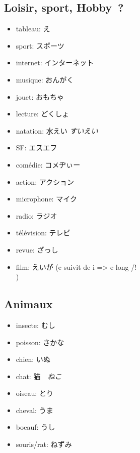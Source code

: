 \documentclass{article}
\begin{document}
\begin{CJK}{UTF8}{min}
   \subsection{Loisir, sport, Hobby~?}
        \begin{itemize}
            \item tableau: え
            \item sport: スポーツ
            \item internet: インターネット
            \item musique: おんがく
            \item jouet: おもちゃ
            \item lecture: どくしょ
            \item natation: 水えい \textit{すいえい}
            \item SF: エスエフ
            \item comédie: コメヂぃー
            \item action: アクション
            \item microphone: マイク
            \item radio: ラジオ
            \item télévision: テレビ
            \item revue: ざっし
            \item film: えいが (e suivit de i => e long /!\\ )
        \end{itemize}
    
    \subsection{Animaux}
    \begin{itemize}
        \item insecte: むし
        \item poisson: さかな
        \item chien: いぬ
        \item chat: 猫　\textit{ねこ}
        \item oiseau: とり
        \item cheval: うま
        \item boeauf: うし
        \item souris/rat: ねずみ
    \end{itemize}


\end{CJK}
\end{document}
